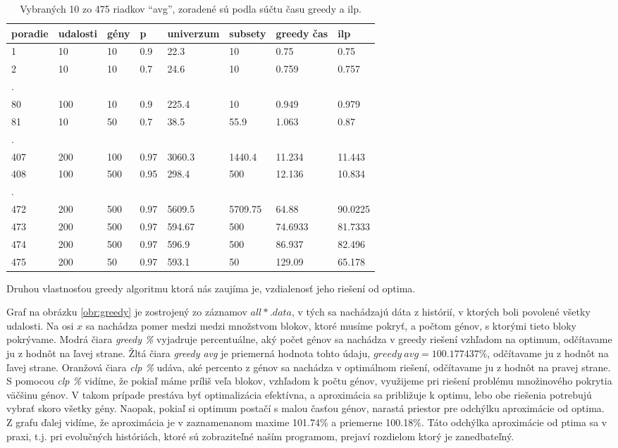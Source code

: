 \begin{table}[t]


\begin{center}
\begin{tabular}{llllllll}
poradie&udalosti&gény&p&univerzum&subsety&greedy čas&ilp\\
\hline
1&10&10&0.9&22.3&10&0.75&0.75\\
2&10&10&0.7&24.6&10&0.759&0.757\\
.\\
80&100&10&0.9&225.4&10&0.949&0.979\\
81&10&50&0.7&38.5&55.9&1.063&0.87\\
.\\
407&200&100&0.97&3060.3&1440.4&11.234&11.443\\
408&100&500&0.95&298.4&500&12.136&10.834\\
.\\
472&200&500&0.97&5609.5&5709.75&64.88&90.0225\\
473&200&500&0.97&594.67&500&74.6933&81.7333\\
474&200&500&0.97&596.9&500&86.937&82.496\\
475&200&50&0.97&593.1&50&129.09&65.178\\
\end{tabular}
\end{center}
\caption{Vybraných 10 zo 475 riadkov ``avg'', zoradené sú podla súčtu času greedy a ilp. }\label{tab:data}
\end{table}

Druhou vlastnosťou greedy algoritmu ktorá nás zaujíma je, vzdialenosť jeho riešení od optima.

Graf na obrázku \ref{obr:greedy} je zostrojený zo záznamov $all*.data$, v tých sa nachádzajú dáta z histórií,
v ktorých boli povolené všetky udalosti. Na osi $x$ sa nachádza pomer medzi medzi množstvom blokov, ktoré musíme pokryť, a počtom génov,
s ktorými tieto bloky pokrývame. Modrá čiara \emph{greedy \%} vyjadruje percentuálne, 
aký počet génov sa nachádza v greedy riešení vzhľadom na optimum, odčítavame ju z hodnôt na ľavej strane. Žltá čiara \emph{greedy avg} je priemerná hodnota tohto údaju,
$greedy\ avg=100.177437\%$, odčítavame ju z hodnôt na ľavej strane. Oranžová čiara \emph{clp \%} udáva, aké percento z génov sa nachádza v optimálnom riešení,
odčítavame ju z hodnôt na pravej strane. 
S pomocou \emph{clp \%} vidíme, že pokiaľ máme príliš veľa blokov, vzhľadom k počtu génov, využijeme pri riešení problému množinového pokrytia väčšinu génov.
V takom prípade prestáva byť optimalizácia efektívna, a aproximácia sa približuje k optimu, lebo obe riešenia potrebujú vybrať skoro všetky gény.
Naopak, pokiaľ si optimum postačí s malou časťou génov, narastá priestor pre odchýlku aproximácie od optima.
Z grafu ďalej vidíme, že aproximácia je v zaznamenanom maxime 101.74\% a priemerne 100.18\%.
Táto odchýlka aproximácie od ptima sa v praxi, t.j. pri evolučných históriách, ktoré sú zobraziteľné naším programom, prejaví rozdielom ktorý je zanedbateľný.


